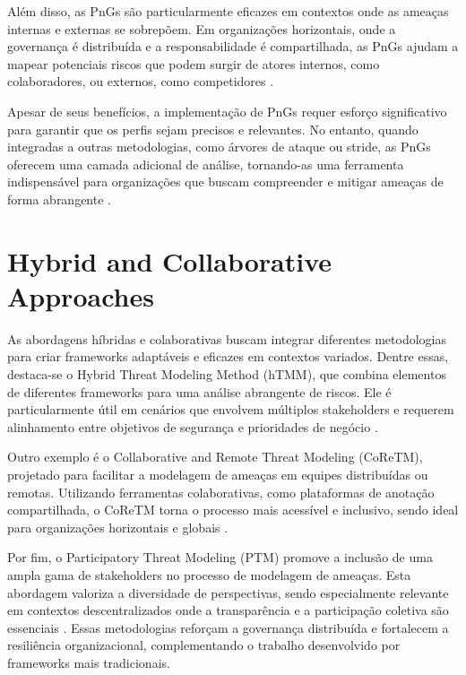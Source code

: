 Além disso, as PnGs são particularmente eficazes em contextos onde as
ameaças internas e externas se sobrepõem. Em organizações horizontais,
onde a governança é distribuída e a responsabilidade é compartilhada,
as PnGs ajudam a mapear potenciais riscos que podem surgir de atores
internos, como colaboradores, ou externos, como competidores
\cite{PersonaeNonGratae}.

Apesar de seus benefícios, a implementação de PnGs requer esforço
significativo para garantir que os perfis sejam precisos e relevantes.
No entanto, quando integradas a outras metodologias, como árvores de
ataque ou \gls{stride}, as PnGs oferecem uma camada adicional de análise,
tornando-as uma ferramenta indispensável para organizações que buscam
compreender e mitigar ameaças de forma abrangente
\cite{PnGRequirementsPhaseThreatModeling}.

\section{Hybrid and Collaborative Approaches}
\label{sec:hybrid_collaborative_approaches}

As abordagens híbridas e colaborativas buscam integrar diferentes
metodologias para criar frameworks adaptáveis e eficazes em contextos
variados. Dentre essas, destaca-se o Hybrid Threat Modeling Method
(hTMM), que combina elementos de diferentes frameworks para uma
análise abrangente de riscos. Ele é particularmente útil em cenários
que envolvem múltiplos stakeholders e requerem alinhamento entre
objetivos de segurança e prioridades de negócio
\cite{AHybridThreatModelingMethod}.

Outro exemplo é o Collaborative and Remote Threat Modeling (CoReTM),
projetado para facilitar a modelagem de ameaças em equipes
distribuídas ou remotas. Utilizando ferramentas colaborativas, como
plataformas de anotação compartilhada, o CoReTM torna o processo mais
acessível e inclusivo, sendo ideal para organizações horizontais e
globais \cite{CoReTM}.

Por fim, o Participatory Threat Modeling (PTM) promove a inclusão de
uma ampla gama de stakeholders no processo de modelagem de ameaças.
Esta abordagem valoriza a diversidade de perspectivas, sendo
especialmente relevante em contextos descentralizados onde a
transparência e a participação coletiva são essenciais
\cite{ParticipatoryThreatModelling}. Essas metodologias reforçam a
governança distribuída e fortalecem a resiliência organizacional,
complementando o trabalho desenvolvido por frameworks mais
tradicionais.



